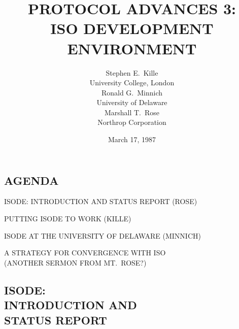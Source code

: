 


\def\tradeORGfont{\rm}
\def\tradeNAMfont{\rm}

\raggedright



\title	{PROTOCOL ADVANCES 3:\\ ISO DEVELOPMENT ENVIRONMENT}
\author	{Stephen E.~Kille\\ University College, London\\[0.15in]
	Ronald G.~Minnich\\ University of Delaware\\[0.15in]
	Marshall T.~Rose\\ Northrop Corporation}
\date	{March 17, 1987}
\maketitlepage


\begin{bwslide}
\part*	{AGENDA}\bf

\begin{nrtc}
\item	ISODE: INTRODUCTION AND STATUS REPORT (ROSE)

\item	PUTTING ISODE TO WORK (KILLE)

\item	ISODE AT THE UNIVERSITY OF DELAWARE (MINNICH)

\item	A STRATEGY FOR CONVERGENCE WITH ISO\\
	(ANOTHER SERMON FROM MT.~ROSE?)
\end{nrtc}
\end{bwslide}


\begin{bwslide}
\part	{ISODE:\\ INTRODUCTION AND\\ STATUS REPORT}
\end{bwslide}


